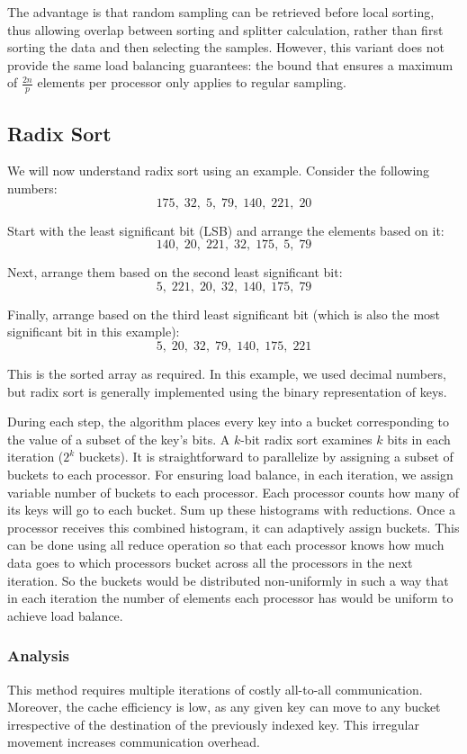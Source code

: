 \documentclass[12pt]{book}
\begin{document}
The advantage is that random sampling can be retrieved before local sorting, thus allowing overlap between sorting and splitter calculation, rather than first sorting the data and then selecting the samples.  
However, this variant does not provide the same load balancing guarantees: the bound that ensures a maximum of $\frac{2n}{p}$ elements per processor only applies to regular sampling.

\subsection{Radix Sort}
We will now understand radix sort using an example. Consider the following numbers:
\[
175,\; 32,\; 5,\; 79,\; 140,\; 221,\; 20
\]

Start with the least significant bit (LSB) and arrange the elements based on it:
\[
140,\; 20,\; 221,\; 32,\; 175,\; 5,\; 79
\]

Next, arrange them based on the second least significant bit:
\[
5,\; 221,\; 20,\; 32,\; 140,\; 175,\; 79
\]

Finally, arrange based on the third least significant bit (which is also the most significant bit in this example):
\[
5,\; 20,\; 32,\; 79,\; 140,\; 175,\; 221
\]

This is the sorted array as required. In this example, we used decimal numbers, but radix sort is generally implemented using the binary representation of keys.

During each step, the algorithm places every key into a bucket corresponding to the value of a subset of the key's bits. A $k$-bit radix sort examines $k$ bits in each iteration ($2^k$ buckets). It is straightforward to parallelize by assigning a subset of buckets to each processor. 
For ensuring load balance, in each iteration, we assign variable number of buckets to each processor. Each processor counts how many of its keys will go to each bucket. Sum up these histograms with reductions. Once a processor receives this combined histogram, it can adaptively assign buckets. This can be done using all reduce operation so that each processor knows how much data goes to which processors bucket across all the processors in the next iteration. So the buckets would be distributed non-uniformly in such a way that in each iteration the number of elements each processor has would be uniform to achieve load balance.

\subsubsection{Analysis}
This method requires multiple iterations of costly all-to-all communication. Moreover, the cache efficiency is low, as any given key can move to any bucket irrespective of the destination of the previously indexed key. This irregular movement increases communication overhead. 
\end{document}
